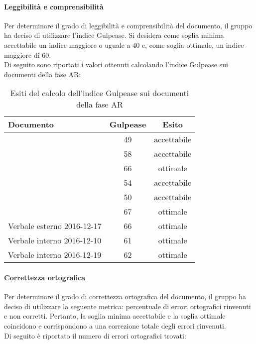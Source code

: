 \documentclass[PianoDiQualifica.tex]{subfiles}
\begin{document}
		\paragraph{Leggibilità e comprensibilità}
		Per determinare il grado di leggibilità e comprensibilità del documento, il gruppo ha deciso di utilizzare l'indice Gulpease. Si desidera come soglia minima accettabile un indice
				maggiore o uguale a 40 e, come soglia ottimale, un indice maggiore di 60.\\
				Di seguito sono riportati i valori ottenuti calcolando l'indice Gulpease sui documenti della fase AR:
				
				\begin{table}[h]
				\centering
				\begin{tabular}{l c c}
					\hline
					\rule[-0.3cm]{0cm}{0.8cm}
					\textbf{Documento} & \textbf{Gulpease} & \textbf{Esito} \\
					\hline
					\rule[0cm]{0cm}{0.4cm}
					\PPdocRR & 49 & accettabile \\
					\rule[0cm]{0cm}{0.4cm}
					\NPdocRR & 58 & accettabile \\ 
					\rule[0cm]{0cm}{0.4cm}
					\ARdocRR & 66 & ottimale \\ 
					\rule[0cm]{0cm}{0.4cm}
					\PQdocRR & 54 & accettabile \\ 
					\rule[0cm]{0cm}{0.4cm}
					\Gldoc & 50 & accettabile\\ 
					\rule[0cm]{0cm}{0.4cm}
					\SDKdoc & 67 & ottimale \\ 
					\rule[0cm]{0cm}{0.4cm}
					Verbale esterno 2016-12-17 & 66 & ottimale\\ 
					\rule[0cm]{0cm}{0.4cm}
					Verbale interno 2016-12-10 & 61 & ottimale\\ 
					\rule[0cm]{0cm}{0.4cm}
					Verbale interno 2016-12-19 & 62 & ottimale\\ 
					
					\hline
				\end{tabular}
				\caption{Esiti del calcolo dell'indice Gulpease sui documenti della fase AR}
			\end{table}		
		\paragraph{Correttezza ortografica}
		Per determinare il grado di correttezza ortografica del documento, il gruppo ha deciso di utilizzare la seguente metrica: percentuale di errori ortografici rinvenuti e non corretti.
				Pertanto, la soglia minima accettabile e la soglia ottimale coincidono e corrispondono a una correzione totale degli errori rinvenuti.\\
				Di seguito è riportato il numero di errori ortografici trovati:\\
				
\end{document}
